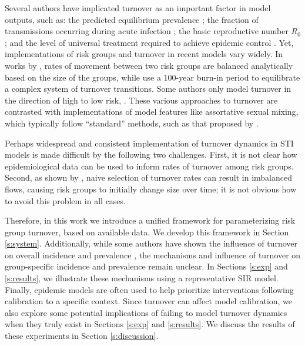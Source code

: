 Several authors have implicated turnover as 
an important factor in model outputs, such as:
the predicted equilibrium prevalence \citep{Stigum1994,Eaton2014};
the fraction of transmissions occurring during acute infection \citep{Zhang2012};
the basic reproductive number $R_0$ \citep{Henry2015}; and
the level of universal treatment required to achieve epidemic control \citep{Henry2015}.
Yet, implementations of risk groups and turnover in recent models vary widely.
In works by \citeauthor{Koopman1997},
rates of movement between two risk groups
are balanced analytically based on the size of the groups,
while \citet{Boily2015} use a 100-year burn-in period
to equilibrate a complex system of turnover transitions.
Some authors only model turnover in the direction of high to low risk,
\citep{Stigum1994,Eaton2014}.
These various approaches to turnover are contrasted with
implementations of model features like assortative sexual mixing,
which typically follow ``standard'' methods,
such as that proposed by \citet{Nold1980}.
\par
Perhaps widespread and consistent implementation of turnover dynamics in STI models
is made difficult by the following two challenges.
First, it is not clear how epidemiological data can be used to
inform rates of turnover among risk groups.
Second, as shown by \citet{Boily2015},
naive selection of turnover rates can result in imbalanced flows,
causing risk groups to initially change size over time;
it is not obvious how to avoid this problem in all cases.
\par
Therefore, in this work we introduce a unified framework for
parameterizing risk group turnover, based on available data.
We develop this framework in Section \ref{s:system}.
Additionally, while some authors have shown the influence
of turnover on overall incidence and prevalence
\citep{Stigum1994,Zhang2012,Henry2015},
the mechanisms and influence of turnover on
group-specific incidence and prevalence remain unclear.
In Sections \ref{s:exp} and \ref{s:results},
we illustrate these mechanisms using a representative SIR model.
Finally, epidemic models are often used to help prioritize interventions
following calibration to a specific context.
Since turnover can affect model calibration,
we also explore some potential implications of failing to model turnover dynamics
when they truly exist in Sections \ref{s:exp} and \ref{s:results}.
We discuss the results of these experiments in Section \ref{s:discussion}.